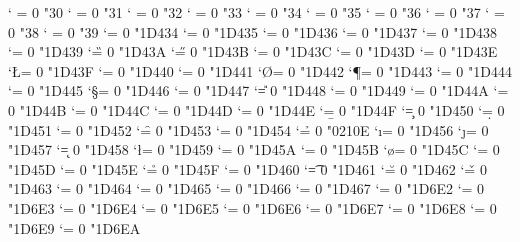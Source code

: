 \Umathcode `\0 = 0 \normalfam "30
\Umathcode `\1 = 0 \normalfam "31
\Umathcode `\2 = 0 \normalfam "32
\Umathcode `\3 = 0 \normalfam "33
\Umathcode `\4 = 0 \normalfam "34
\Umathcode `\5 = 0 \normalfam "35
\Umathcode `\6 = 0 \normalfam "36
\Umathcode `\7 = 0 \normalfam "37
\Umathcode `\8 = 0 \normalfam "38
\Umathcode `\9 = 0 \normalfam "39
\Umathcode `\A = 0 \normalfam "1D434
\Umathcode `\B = 0 \normalfam "1D435
\Umathcode `\C = 0 \normalfam "1D436
\Umathcode `\D = 0 \normalfam "1D437
\Umathcode `\E = 0 \normalfam "1D438
\Umathcode `\F = 0 \normalfam "1D439
\Umathcode `\G = 0 \normalfam "1D43A
\Umathcode `\H = 0 \normalfam "1D43B
\Umathcode `\I = 0 \normalfam "1D43C
\Umathcode `\J = 0 \normalfam "1D43D
\Umathcode `\K = 0 \normalfam "1D43E
\Umathcode `\L = 0 \normalfam "1D43F
\Umathcode `\M = 0 \normalfam "1D440
\Umathcode `\N = 0 \normalfam "1D441
\Umathcode `\O = 0 \normalfam "1D442
\Umathcode `\P = 0 \normalfam "1D443
\Umathcode `\Q = 0 \normalfam "1D444
\Umathcode `\R = 0 \normalfam "1D445
\Umathcode `\S = 0 \normalfam "1D446
\Umathcode `\T = 0 \normalfam "1D447
\Umathcode `\U = 0 \normalfam "1D448
\Umathcode `\V = 0 \normalfam "1D449
\Umathcode `\W = 0 \normalfam "1D44A
\Umathcode `\X = 0 \normalfam "1D44B
\Umathcode `\Y = 0 \normalfam "1D44C
\Umathcode `\Z = 0 \normalfam "1D44D
\Umathcode `\a = 0 \normalfam "1D44E
\Umathcode `\b = 0 \normalfam "1D44F
\Umathcode `\c = 0 \normalfam "1D450
\Umathcode `\d = 0 \normalfam "1D451
\Umathcode `\e = 0 \normalfam "1D452
\Umathcode `\f = 0 \normalfam "1D453
\Umathcode `\g = 0 \normalfam "1D454
\Umathcode `\h = 0 \normalfam "0210E %
\Umathcode `\i = 0 \normalfam "1D456
\Umathcode `\j = 0 \normalfam "1D457
\Umathcode `\k = 0 \normalfam "1D458
\Umathcode `\l = 0 \normalfam "1D459
\Umathcode `\m = 0 \normalfam "1D45A
\Umathcode `\n = 0 \normalfam "1D45B
\Umathcode `\o = 0 \normalfam "1D45C
\Umathcode `\p = 0 \normalfam "1D45D
\Umathcode `\q = 0 \normalfam "1D45E
\Umathcode `\r = 0 \normalfam "1D45F
\Umathcode `\s = 0 \normalfam "1D460
\Umathcode `\t = 0 \normalfam "1D461
\Umathcode `\u = 0 \normalfam "1D462
\Umathcode `\v = 0 \normalfam "1D463
\Umathcode `\w = 0 \normalfam "1D464
\Umathcode `\x = 0 \normalfam "1D465
\Umathcode `\y = 0 \normalfam "1D466
\Umathcode `\z = 0 \normalfam "1D467
\Umathcode `\Α = 0 \normalfam "1D6E2
\Umathcode `\Β = 0 \normalfam "1D6E3
\Umathcode `\Γ = 0 \normalfam "1D6E4
\Umathcode `\Δ = 0 \normalfam "1D6E5
\Umathcode `\Ε = 0 \normalfam "1D6E6
\Umathcode `\Ζ = 0 \normalfam "1D6E7
\Umathcode `\Η = 0 \normalfam "1D6E8
\Umathcode `\Θ = 0 \normalfam "1D6E9
\Umathcode `\Ι = 0 \normalfam "1D6EA
